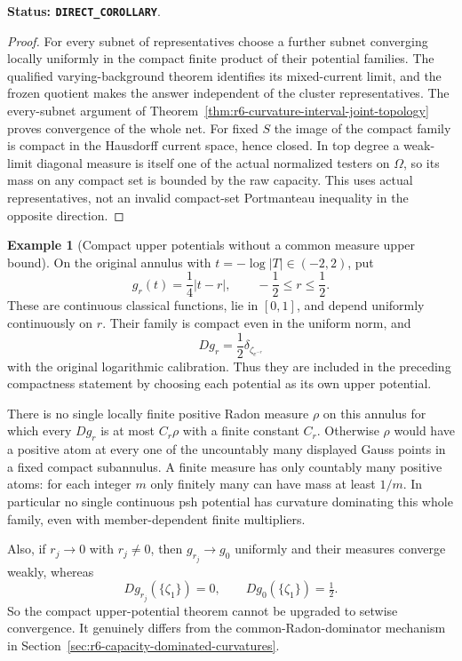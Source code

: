 \documentclass[11pt,a4paper]{article}
\numberwithin{equation}{section}
\theoremstyle{definition}
\newtheorem{example}[theorem]{Example}
\theoremstyle{remark}
\begin{document}
\noindent\textbf{Status: \texttt{DIRECT\_COROLLARY}}.

\begin{proof}
For every subnet of representatives choose a further subnet converging
locally uniformly in the compact finite product of their potential
families. The qualified varying-background theorem identifies its
mixed-current limit, and the frozen quotient makes the answer
independent of the cluster representatives. The every-subnet argument
of Theorem~\ref{thm:r6-curvature-interval-joint-topology} proves
convergence of the whole net. For fixed $S$ the image of the compact
family is compact in the Hausdorff current space, hence closed.
In top degree a weak-limit diagonal measure is itself one of the
actual normalized testers on $\Omega$, so its mass on any compact set
is bounded by
the raw capacity. This uses actual representatives, not an invalid
compact-set Portmanteau inequality in the opposite direction.
\end{proof}

\begin{example}[Compact upper potentials without a common measure upper bound]
\label{ex:r6-moving-hinge-upper-family}
On the original annulus with $t=-\log|T|\in(-2,2)$, put
\[
              g_r(t)=\frac14|t-r|,\qquad -\frac12\le r\le\frac12.
\]
These are continuous classical functions, lie in $[0,1]$, and depend
uniformly continuously on $r$. Their family is compact even in the
uniform norm, and
\[
                         Dg_r=\frac12\delta_{\zeta_{e^{-r}}}
\]
with the original logarithmic calibration. Thus they are included
in the preceding compactness statement by choosing each potential
as its own upper potential.

There is no single locally finite positive Radon measure $\rho$ on
this annulus for which every $Dg_r$ is at most $C_r\rho$ with a finite
constant $C_r$. Otherwise $\rho$ would have a positive atom at every
one of the uncountably many displayed Gauss points in a fixed compact
subannulus. A finite measure has only countably many positive atoms:
for each integer $m$ only finitely many can have mass at least $1/m$.
In particular no single continuous psh potential has curvature
dominating this whole family, even with member-dependent finite
multipliers.

Also, if $r_j\to0$ with $r_j\ne0$, then $g_{r_j}\to g_0$ uniformly
and their measures converge weakly, whereas
\[
       Dg_{r_j}(\{\zeta_1\})=0,
              \qquad Dg_0(\{\zeta_1\})=\tfrac12.
\]
So the compact upper-potential theorem cannot be upgraded to setwise
convergence. It genuinely differs from the common-Radon-dominator
mechanism in Section~\ref{sec:r6-capacity-dominated-curvatures}.
\end{example}
\end{document}
